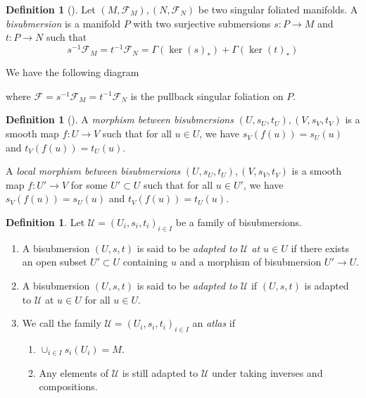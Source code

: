 \documentclass[12pt]{amsart}
\theoremstyle{definition}
\newtheorem{defn}[thm]{Definition}
\theoremstyle{remark}
\numberwithin{equation}{section}
\newcommand{\CF}{{\mathcal F}}
\newcommand{\1}{{\mathbb{1}}}
\begin{document}
\begin{defn}[\cite{AS06}]

Let $(M, \CF_M), (N, \CF_N)$ be two singular foliated manifolds. A {\it bisubmersion} is a manifold $P$ with two surjective submersions  $s: P\to M$ and $t: P\to N$ such that 
$$s^{-1} \CF_M = t^{-1} \CF_N = \Gamma(\ker(s)_*) + \Gamma(\ker(t)_*)$$

We have the following diagram
    \begin{center}
    \end{center}
where $\CF = s^{-1} \CF_M = t^{-1} \CF_N$ is the pullback singular foliation on $P$.


\end{defn}
\begin{defn}[]
    A {\it morphism between bisubmersions} $(U, s_U, t_U), (V, s_V, t_V)$ is a smooth map $f:U \to V$ such that for all $u\in U$, we have $s_V(f(u)) = s_U(u)$ and 
    $t_V(f(u)) = t_U(u)$.
    
    A {\it local morphism between bisubmersions} $(U, s_U, t_U), (V, s_V, t_V)$ is a smooth map $f:U' \to V$ for some $U'\subset U$ such that for all $u\in U'$, we have $s_V(f(u)) = s_U(u)$ and 
    $t_V(f(u)) = t_U(u)$.
\end{defn}

\begin{defn}
    Let $\mathcal{U} = (U_i, s_i, t_i)_{i\in I}$ be a family of bisubmersions.
    \begin{enumerate}
        \item A bisubmersion $(U,s,t)$ is said to be {\it adapted to $\mathcal{U}$ at $u\in U$} if there exists an open subset $U'\subset U$ containing $u$ and a morphism of bisubmersion $U'\to U$.
        \item A bisubmersion $(U,s,t)$ is said to be {\it adapted to $\mathcal{U}$} if $(U,s,t)$ is adapted to $\mathcal{U}$ at $u\in U$ for all $u\in U$.
        \item We call the family $\mathcal{U} = (U_i, s_i, t_i)_{i\in I}$ an {\it atlas} if \begin{enumerate}
            \item $\cup_{i\in I}s_i(U_i) = M$.
            \item Any elements of $\mathcal{U}$ is still adapted to $\mathcal{U}$ under taking inverses and compositions.
        \end{enumerate}
    \end{enumerate}
\end{defn}
\end{document}
